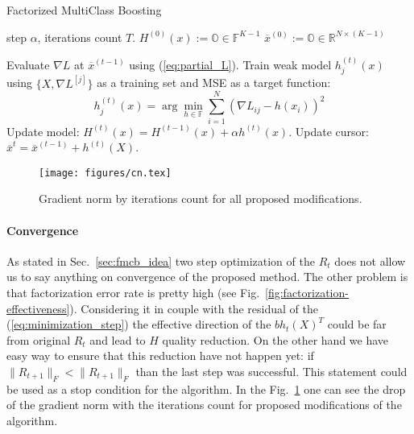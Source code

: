 \documentclass{article}
\begin{document}
\begin{algorithm}[tb]
   \caption{Factorized MultiClass Boosting}
   \label{alg:boost_mlr}
\begin{algorithmic}
    step $\alpha$, iterations count $T$.
   \STATE $H^{(0)}(x):= \mathbb{O} \in \mathbb{F}^{K-1}$ 
   \STATE $\overline{x}^{(0)} := \mathbb{O} \in \mathbb{R}^{N \times (K-1)}$ 

   		\STATE Evaluate $\nabla L$ at $\overline{x}^{(t-1)}$ using (\ref{eq:partial_L}).
   			\STATE Train weak model $h_{j}^{(t)}(x)$ using $\{X,\nabla L^{[j]}\}$ as a training set and MSE as a target function:
   			\[
				h_{j}^{(t)}(x)=\arg\min_{h \in \mathbb{F}} \sum_{i=1}^{N}\left(\nabla L_{ij}-h(x_{i})\right)^{2}
			\]
		\ENDFOR
		\STATE Update model: $H^{(t)}(x)=H^{(t-1)}(x)+\alpha h^{(t)}(x)$.
		\STATE Update cursor: $\overline{x}^{t} = \overline{x}^{(t-1)} + h^{(t)}(X)$.
   \ENDFOR
   
\end{algorithmic}
\end{algorithm}

\begin{figure}
\vskip 0.2in
\begin{center}
\centerline{\texttt{[image: figures/cn.tex]}}
\caption{Gradient norm by iterations count for all proposed modifications.}
\end{center}
\label{fig:gradient_norm}
\vskip -0.2in
\end{figure}

\paragraph{Convergence}
As stated in Sec.~\ref{sec:fmcb_idea} two step optimization of the $R_t$ does not allow us to say anything on convergence of the proposed method. The other problem is that factorization error rate is pretty high (see Fig.~\ref{fig:factorization-effectiveness}). Considering it in couple with the residual of the (\ref{eq:minimization_step}) the effective direction of the $b h_t(X)^T$ could be far from original $R_t$ and lead to $H$ quality reduction. On the other hand we have easy way to ensure that this reduction have not happen yet: if $\|R_{t+1}\|_F <\|R_{t+1}\|_F$ than the last step was successful. This statement could be used as a stop condition for the algorithm. In the Fig.~\ref{fig:gradient_norm} one can see the drop of the gradient norm with the iterations count for proposed modifications of the algorithm.
\end{document}
